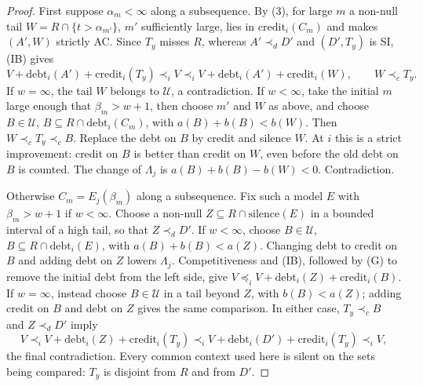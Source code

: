 \documentclass[11pt]{article}
\theoremstyle{remark}\newtheorem{remark}[theorem]{Remark}
\newcommand{\cred}{\mathrm{credit}}
\newcommand{\debt}{\mathrm{debt}}
\newcommand{\U}{\mathcal U}
\begin{document}
\begin{proof}
First suppose $\alpha_m<\infty$ along a subsequence. By (3), for large
$m$ a non-null tail $W=R\cap\{t>\alpha_{m'}\}$, $m'$ sufficiently large,
lies in $\cred_i(C_m)$ and makes $(A',W)$ strictly AC. Since $T_y$
misses $R$, whereas $A'\prec_dD'$ and $(D',T_y)$ is SI, (IB) gives
\[
 V+\debt_i(A')+\cred_i(T_y)\prec_i V
 \prec_i V+\debt_i(A')+\cred_i(W),\qquad W\prec_cT_y.
\]
If $w=\infty$, the tail $W$ belongs to $\U$, a contradiction.
If $w<\infty$, take the initial $m$ large enough that $\beta_m>w+1$,
then choose $m'$ and $W$ as above, and choose
$B\in\U$, $B\subseteq R\cap\debt_i(C_m)$, with
$a(B)+b(B)<b(W)$. Then $W\prec_cT_y\prec_c B$.
Replace the debt on $B$ by credit and silence $W$.
At $i$ this is a strict improvement: credit on $B$ is better than credit
on $W$, even before the old debt on $B$ is counted. The change of
$\Lambda_j$ is $a(B)+b(B)-b(W)<0$. Contradiction.

Otherwise $C_m=E_j(\beta_m)$ along a subsequence. Fix such a model $E$
with $\beta_m>w+1$ if $w<\infty$. Choose a non-null
$Z\subseteq R\cap\text{silence}(E)$ in a bounded interval of a high tail, so that
$Z\prec_dD'$. If $w<\infty$, choose
$B\in\U$, $B\subseteq R\cap\debt_i(E)$, with $a(B)+b(B)<a(Z)$.
Changing debt to credit on $B$ and adding debt on $Z$ lowers
$\Lambda_j$. Competitiveness and (IB), followed by (G) to remove the
initial debt from the left side, give
$V\preceq_iV+\debt_i(Z)+\cred_i(B)$.
If $w=\infty$, instead choose $B\in\U$ in a tail beyond $Z$, with
$b(B)<a(Z)$; adding credit on $B$ and debt on $Z$ gives the same
comparison. In either case, $T_y\prec_c B$ and $Z\prec_dD'$ imply
\[
 V\prec_i V+\debt_i(Z)+\cred_i(T_y)
 \prec_i V+\debt_i(D')+\cred_i(T_y)\prec_i V,
\]
the final contradiction. Every common context used here is silent on
the sets being compared: $T_y$ is disjoint from $R$ and from $D'$.
\end{proof}
\end{document}
